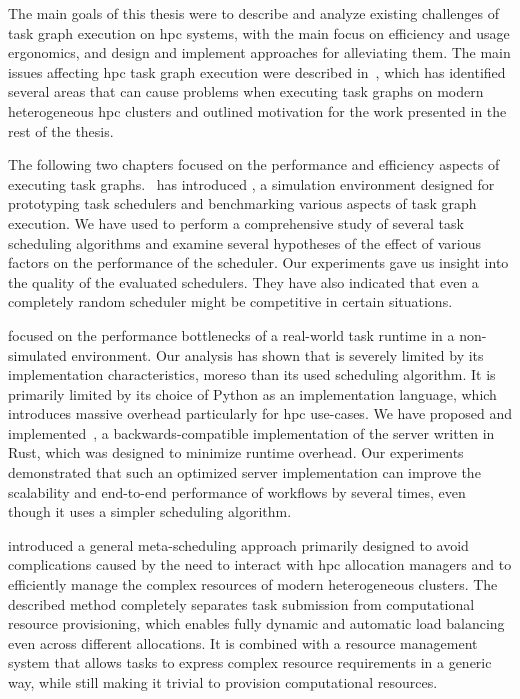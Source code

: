 The main goals of this thesis were to describe and analyze existing challenges of task graph
execution on \gls{hpc} systems, with the main focus on efficiency and usage
ergonomics, and design and implement approaches for alleviating them. The main issues affecting
\gls{hpc} task graph execution were described in~, which
has identified several areas that can cause problems when executing task graphs on modern
heterogeneous \gls{hpc} clusters and outlined motivation for the work presented in
the rest of the thesis.

The following two chapters focused on the performance and efficiency aspects of executing task
graphs.~ has introduced \estee{}, a simulation
environment designed for prototyping task schedulers and benchmarking various aspects of task graph
execution. We have used \estee{} to perform a comprehensive study of several task
scheduling algorithms and examine several hypotheses of the effect of various factors on the
performance of the scheduler. Our experiments gave us insight into the quality of the evaluated
schedulers. They have also indicated that even a completely random scheduler might be competitive
in certain situations.


 focused on the performance bottlenecks of a real-world task runtime
\dask{} in a non-simulated environment. Our analysis
has shown that \dask{} is severely limited by its implementation
characteristics, moreso than its used scheduling algorithm. It is primarily limited by its choice
of Python as an implementation language, which introduces massive overhead particularly for
\gls{hpc} use-cases. We have proposed and implemented~\rsds{},
a backwards-compatible implementation of the \dask{} server written in Rust,
which was designed to minimize runtime overhead. Our experiments demonstrated that such an
optimized server implementation can improve the scalability and end-to-end performance of
\dask{} workflows by several times, even though it uses a simpler scheduling
algorithm.

 introduced a
general meta-scheduling approach primarily designed to avoid complications caused by the need to
interact with \gls{hpc} allocation managers and to efficiently manage the complex
resources of modern heterogeneous clusters. The described method completely separates task
submission from computational resource provisioning, which enables fully dynamic and automatic load
balancing even across different allocations. It is combined with a resource management system that
allows tasks to express complex resource requirements in a generic way, while still making it
trivial to provision computational resources.

